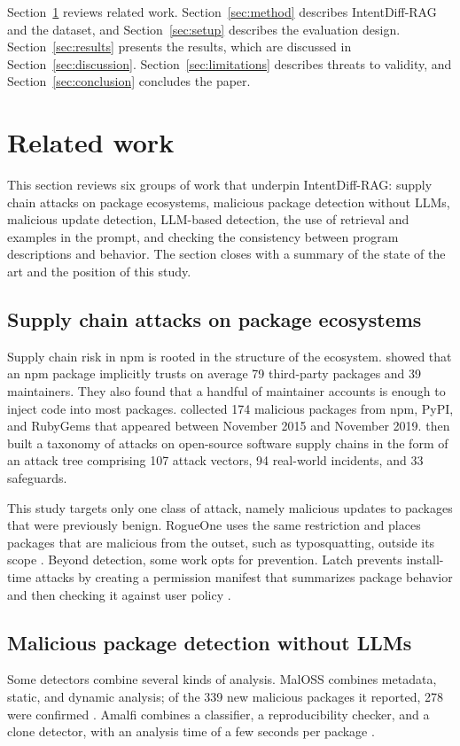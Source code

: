 \documentclass[a4paper,fleqn]{cas-dc}
\begin{document}
Section~\ref{sec:related} reviews related work.
Section~\ref{sec:method} describes IntentDiff-RAG and the dataset, and
Section~\ref{sec:setup} describes the evaluation design.
Section~\ref{sec:results} presents the results, which are discussed in
Section~\ref{sec:discussion}. Section~\ref{sec:limitations} describes threats
to validity, and Section~\ref{sec:conclusion} concludes the paper.


\section{Related work}\label{sec:related}
This section reviews six groups of work that underpin IntentDiff-RAG: supply
chain attacks on package ecosystems, malicious package detection without LLMs,
malicious update detection, LLM-based detection, the use of retrieval
and examples in the prompt, and checking the consistency between program
descriptions and behavior. The section closes with a summary of the state of
the art and the position of this study.

\subsection{Supply chain attacks on package ecosystems}
Supply chain risk in npm is rooted in the structure of the ecosystem.
\citet{zimmermann2019small} showed that an npm package implicitly trusts on
average 79 third-party packages and 39 maintainers. They also found that a
handful of maintainer accounts is enough to inject code into most packages.
\citet{ohm2020backstabber} collected 174 malicious packages from npm, PyPI, and
RubyGems that appeared between November 2015 and November 2019.
\citet{ladisa2023sok} then built a taxonomy of attacks on open-source
software supply chains in the form of an attack tree comprising 107 attack
vectors, 94 real-world incidents, and 33 safeguards.

This study targets only one class of attack, namely malicious updates to
packages that were previously benign. RogueOne uses the same restriction and
places packages that are malicious from the outset, such as
typosquatting, outside its scope \citep{sofaer2024rogueone}. Beyond
detection, some work opts for prevention. Latch prevents install-time attacks by
creating a permission manifest that summarizes package behavior and then
checking it against user policy \citep{wyss2022wolf}.

\subsection{Malicious package detection without LLMs}
Some detectors combine several kinds of analysis. MalOSS combines metadata,
static, and dynamic analysis; of the 339 new malicious packages it reported, 278
were confirmed \citep{duan2021towards}. Amalfi combines a classifier, a
reproducibility checker, and a clone detector, with an analysis time of a few
seconds per package \citep{sejfia2022practical}.
\end{document}

